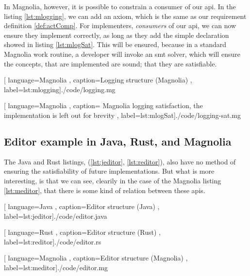 In Magnolia, however, it is possible to constrain a consumer of our \gls*{api}.
In the listing \ref{lst:mlogging}, we can add an axiom, which is the same as our
requirement definition \ref{def:actComp}. For implementers, \textit{consumers}
of our \gls*{api}, we can now ensure they implement correctly, as long as they
add the simple declaration showed in listing \ref{lst:mlogSat}. This will be
ensured, because in a standard Magnolia work routine, a developer will invoke an
\gls*{smt} solver, which will ensure the concepts, that are implemented are
sound; that they are satisfiable.

\begin{center}
  
    [ language=Magnolia
    , caption={Logging structure (Magnolia)}
    , label=lst:mlogging]{./code/logging.mg}
\end{center}

\begin{center}
  
    [ language=Magnolia
    , caption={
        Magnolia logging satisfaction, the implementation is left out for
        brevity
      }
    , label=lst:mlogSat]{./code/logging-sat.mg}
\end{center}

\subsection{Editor example in Java, Rust, and Magnolia}

The Java and Rust listings, (\ref{lst:jeditor}, \ref{lst:reditor}), also have no
method of ensuring the satisfiability of future implementations. But what is
more interesting, is that we can see, clearily in the case of the Magnolia
listing \ref{lst:meditor}, that there is some kind of relation between these
\gls*{api}s.

\begin{code}[H]
  
    [ language=Java
    , caption={Editor structure (Java)}
    , label=lst:jeditor]{./code/editor.java}
\end{code}

\begin{code}[H]
  
    [ language=Rust
    , caption={Editor structure (Rust)}
    , label=lst:reditor]{./code/editor.rs}
\end{code}

\begin{code}[H]
  
    [ language=Magnolia
    , caption={Editor structure (Magnolia)}
    , label=lst:meditor]{./code/editor.mg}
\end{code}


